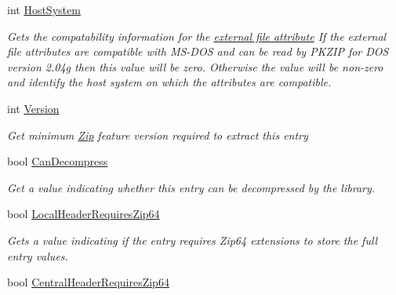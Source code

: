 \begin{DoxyCompactItemize}
int \hyperlink{class_i_c_sharp_code_1_1_sharp_zip_lib_1_1_zip_1_1_zip_entry_a7fd80df84f1d8f6e8184816de2a5ebe2}{Host\+System}
\begin{DoxyCompactList}\small\item\em Gets the compatability information for the \hyperlink{class_i_c_sharp_code_1_1_sharp_zip_lib_1_1_zip_1_1_zip_entry_a1e5dfa12a33a3b0a14dad39e7ec7d2cc}{external file attribute} If the external file attributes are compatible with M\+S-\/\+D\+OS and can be read by P\+K\+Z\+IP for D\+OS version 2.\+04g then this value will be zero. Otherwise the value will be non-\/zero and identify the host system on which the attributes are compatible. \end{DoxyCompactList}\item 
int \hyperlink{class_i_c_sharp_code_1_1_sharp_zip_lib_1_1_zip_1_1_zip_entry_a307247336a78d36b538666d7581f6136}{Version}
\begin{DoxyCompactList}\small\item\em Get minimum \hyperlink{namespace_i_c_sharp_code_1_1_sharp_zip_lib_1_1_zip}{Zip} feature version required to extract this entry \end{DoxyCompactList}\item 
bool \hyperlink{class_i_c_sharp_code_1_1_sharp_zip_lib_1_1_zip_1_1_zip_entry_a4d8f5443da5c03733c18fc6c488418c7}{Can\+Decompress}
\begin{DoxyCompactList}\small\item\em Get a value indicating whether this entry can be decompressed by the library. \end{DoxyCompactList}\item 
bool \hyperlink{class_i_c_sharp_code_1_1_sharp_zip_lib_1_1_zip_1_1_zip_entry_a10a032c85a2ca3eab7079e44770b4e7a}{Local\+Header\+Requires\+Zip64}
\begin{DoxyCompactList}\small\item\em Gets a value indicating if the entry requires Zip64 extensions to store the full entry values. \end{DoxyCompactList}\item 
bool \hyperlink{class_i_c_sharp_code_1_1_sharp_zip_lib_1_1_zip_1_1_zip_entry_a10426a2d2b60aade11eea665edf6b618}{Central\+Header\+Requires\+Zip64}

\end{DoxyCompactItemize}
